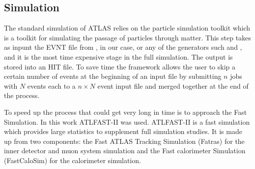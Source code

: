 \subsection{Simulation}
The standard simulation of ATLAS relies on the \geant particle simulation toolkit which is a toolkit for simulating the passage of particles through matter. This step takes as inpunt the EVNT file from \PYTHIA, in our case, or any of the generators such \HERWIG and \SHERPA, and it is the most time expensive stage in the full simulation. The output is stored into an HIT file. To save time the framework allows the user to skip a certain number of events at the beginning of an input file by submitting $n$ jobs with $N$ events each to a $n\times N$ event input file and merged together at the end of the process.



To speed up the process that could get very long in time is to approach the Fast Simulation. In this work ATLFAST-II was used. ATLFAST-II is a fast simulation which provides large statistics to supplement full simulation studies. It is made up from two components: the Fast ATLAS Tracking Simulation (Fatras) for the inner detector and muon system simulation and the Fast calorimeter Simulation (FastCaloSim) for the calorimeter simulation. 

